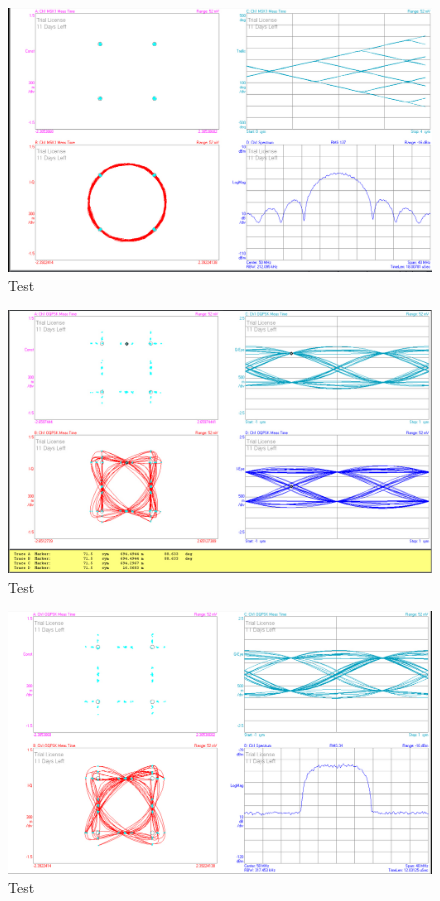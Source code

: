 \documentclass[12pt,a4paper,ngerman]{article}
\begin{document}
\begin{figure}[H]
\centering
\includegraphics[width=\textwidth]{figures/Aufgabe3_MSK_avg.jpg} 
\caption{Test}
\end{figure}

\begin{figure}[H]
\centering
\includegraphics[width=\textwidth]{figures/Aufgabe3_OQPSK.jpg} 
\caption{Test}
\end{figure}

\begin{figure}[H]
\centering
\includegraphics[width=\textwidth]{figures/Aufgabe3_OQPSK_avg.jpg} 
\caption{Test}
\end{figure}
\end{document}
